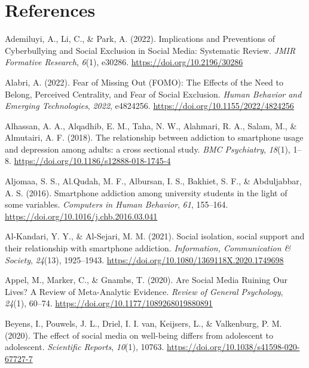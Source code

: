 \documentclass[]{interact}
\theoremstyle{plain}%
\theoremstyle{definition}
\theoremstyle{remark}
\newlength{\cslhangindent}
\newlength{\cslentryspacingunit} %
\newenvironment{CSLReferences}[2] %
 {%
  \setlength{\parindent}{0pt}
  \ifodd #1
  \let\oldpar\par
  \def\par{\hangindent=\cslhangindent\oldpar}
  \fi
  \setlength{\parskip}{#2\cslentryspacingunit}
 }%
 {}
\begin{document}
\newpage{}

\hypertarget{references}{%
\section{References}\label{references}}

\hypertarget{refs}{}
\begin{CSLReferences}{1}{0}
\leavevmode{}%
Ademiluyi, A., Li, C., \& Park, A. (2022). Implications and Preventions
of Cyberbullying and Social Exclusion in Social Media: Systematic
Review. \emph{JMIR Formative Research}, \emph{6}(1), e30286.
\url{https://doi.org/10.2196/30286}

\leavevmode{}%
Alabri, A. (2022). Fear of Missing Out (FOMO): The Effects of the Need
to Belong, Perceived Centrality, and Fear of Social Exclusion.
\emph{Human Behavior and Emerging Technologies}, \emph{2022}, e4824256.
\url{https://doi.org/10.1155/2022/4824256}

\leavevmode{}%
Alhassan, A. A., Alqadhib, E. M., Taha, N. W., Alahmari, R. A., Salam,
M., \& Almutairi, A. F. (2018). The relationship between addiction to
smartphone usage and depression among adults: a cross sectional study.
\emph{BMC Psychiatry}, \emph{18}(1), 1--8.
\url{https://doi.org/10.1186/s12888-018-1745-4}

\leavevmode{}%
Aljomaa, S. S., Al.Qudah, M. F., Albursan, I. S., Bakhiet, S. F., \&
Abduljabbar, A. S. (2016). Smartphone addiction among university
students in the light of some variables. \emph{Computers in Human
Behavior}, \emph{61}, 155--164.
\url{https://doi.org/10.1016/j.chb.2016.03.041}

\leavevmode{}%
Al-Kandari, Y. Y., \& Al-Sejari, M. M. (2021). Social isolation, social
support and their relationship with smartphone addiction.
\emph{Information, Communication \& Society}, \emph{24}(13), 1925--1943.
\url{https://doi.org/10.1080/1369118X.2020.1749698}

\leavevmode{}%
Appel, M., Marker, C., \& Gnambs, T. (2020). Are Social Media Ruining
Our Lives? A Review of Meta-Analytic Evidence. \emph{Review of General
Psychology}, \emph{24}(1), 60--74.
\url{https://doi.org/10.1177/1089268019880891}

\leavevmode{}%
Beyens, I., Pouwels, J. L., Driel, I. I. van, Keijsers, L., \&
Valkenburg, P. M. (2020). The effect of social media on well-being
differs from adolescent to adolescent. \emph{Scientific Reports},
\emph{10}(1), 10763. \url{https://doi.org/10.1038/s41598-020-67727-7}


\end{CSLReferences}
\end{document}
